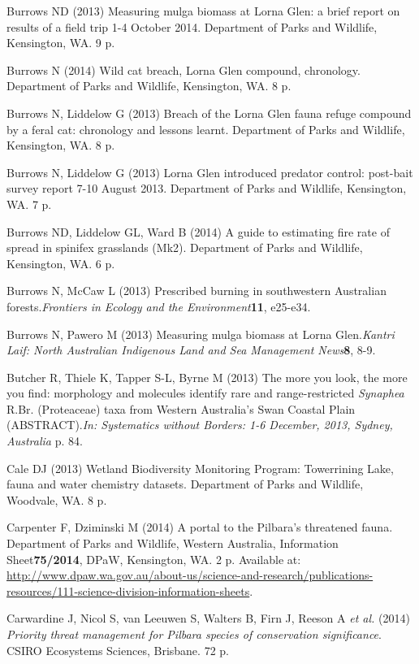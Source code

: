 \documentclass[version=last, paper=a4, DIV=18, usenames, dvipsnames]{scrartcl}
\begin{document}
Burrows ND (2013) Measuring mulga biomass at Lorna Glen: a brief report on results of a field trip 1-4 October 2014. Department of Parks and Wildlife, Kensington, WA. 9 p.


Burrows N (2014) Wild cat breach, Lorna Glen compound, chronology. Department of Parks and Wildlife, Kensington, WA. 8 p.


Burrows N, Liddelow G (2013) Breach of the Lorna Glen fauna refuge compound by a feral cat: chronology and lessons learnt. Department of Parks and Wildlife, Kensington, WA. 8 p.


Burrows N, Liddelow G (2013) Lorna Glen introduced predator control: post-bait survey report 7-10 August 2013. Department of Parks and Wildlife, Kensington, WA. 7 p.


Burrows ND, Liddelow GL, Ward B (2014) A guide to estimating fire rate of spread in spinifex grasslands (Mk2). Department of Parks and Wildlife, Kensington, WA. 6 p.


Burrows N, McCaw L (2013) Prescribed burning in southwestern Australian forests.\emph{Frontiers in Ecology and the Environment}\textbf{11}, e25-e34.


Burrows N, Pawero M (2013) Measuring mulga biomass at Lorna Glen.\emph{Kantri Laif: North Australian Indigenous Land and Sea Management News}\textbf{8}, 8-9.


Butcher R, Thiele K, Tapper S-L, Byrne M (2013) The more you look, the more you find: morphology and molecules identify rare and range-restricted \emph{Synaphea} R.Br. (Proteaceae) taxa from Western Australia's Swan Coastal Plain (ABSTRACT).\emph{In: Systematics without Borders: 1-6 December, 2013, Sydney, Australia} p. 84.


Cale DJ (2013) Wetland Biodiversity Monitoring Program: Towerrining Lake, fauna and water chemistry datasets. Department of Parks and Wildlife, Woodvale, WA. 8 p.

Carpenter F, Dziminski M (2014) A portal to the Pilbara's threatened fauna. Department of Parks and Wildlife, Western Australia, Information Sheet\textbf{75/2014}, DPaW, Kensington, WA. 2 p. Available at: \href{http://www.dpaw.wa.gov.au/about-us/science-and-research/publications-resources/111-science-division-information-sheets}{http://www.dpaw.wa.gov.au/about-us/science-and-research/publications-resources/111-science-division-information-sheets}.


Carwardine J, Nicol S, van Leeuwen S, Walters B, Firn J, Reeson A \emph{et al.} (2014) \emph{Priority threat management for Pilbara species of conservation significance}. CSIRO Ecosystems Sciences, Brisbane. 72 p.
\end{document}
